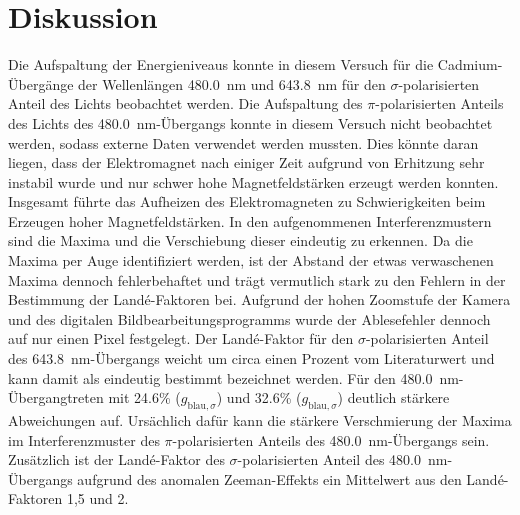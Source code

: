\newpage
\section{Diskussion}
    Die Aufspaltung der Energieniveaus konnte in diesem Versuch für die Cadmium-Übergänge der Wellenlängen \SI{480.0}{\nano\metre} und \SI{643.8}{\nano\metre} für den $\sigma$-polarisierten Anteil des Lichts 
    beobachtet werden. Die Aufspaltung des $\pi$-polarisierten Anteils des Lichts des \SI{480.0}{\nano\metre}-Übergangs konnte in diesem Versuch nicht beobachtet werden, sodass externe Daten verwendet werden 
    mussten. Dies könnte daran liegen, dass der Elektromagnet nach einiger Zeit aufgrund von Erhitzung sehr instabil wurde und nur schwer hohe Magnetfeldstärken erzeugt werden konnten. Insgesamt führte das
    Aufheizen des Elektromagneten zu Schwierigkeiten beim Erzeugen hoher Magnetfeldstärken.\newline 
    In den aufgenommenen Interferenzmustern sind die Maxima und die Verschiebung dieser eindeutig zu erkennen. Da die 
    Maxima per Auge identifiziert werden, ist der Abstand der etwas verwaschenen Maxima dennoch fehlerbehaftet und trägt vermutlich stark zu den Fehlern in der Bestimmung der Landé-Faktoren bei. 
    Aufgrund der hohen Zoomstufe der Kamera und des digitalen Bildbearbeitungsprogramms wurde der Ablesefehler dennoch auf nur einen Pixel festgelegt.\newline
    Der Landé-Faktor für den $\sigma$-polarisierten Anteil des
    \SI{643.8}{\nano\metre}-Übergangs weicht um circa einen Prozent vom Literaturwert und kann damit als eindeutig bestimmt bezeichnet werden. Für den \SI{480.0}{\nano\metre}-Übergangtreten mit \num{24.6}\% 
    ($g_{\text{blau}, \sigma}$) und \num{32.6}\% ($g_{\text{blau}, \sigma}$) deutlich stärkere Abweichungen auf. Ursächlich dafür kann die stärkere Verschmierung der Maxima im Interferenzmuster des 
    $\pi$-polarisierten Anteils des \SI{480.0}{\nano\metre}-Übergangs sein. Zusätzlich ist der Landé-Faktor des $\sigma$-polarisierten Anteil des \SI{480.0}{\nano\metre}-Übergangs aufgrund des anomalen 
    Zeeman-Effekts ein Mittelwert aus den Landé-Faktoren 1,5 und 2. 


